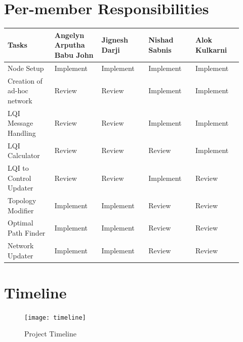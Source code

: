 \documentclass{article}
\begin{document}
\section{Per-member Responsibilities}
\begin{tabular}{ | p{0.185\linewidth} | p{0.185\linewidth} | p{0.185\linewidth} | p{0.185\linewidth} | p{0.185\linewidth} | }
\hline
\textbf{Tasks}	&	\textbf{Angelyn Arputha Babu John}	&	\textbf{Jignesh Darji}	&	\textbf{Nishad Sabnis}	& \textbf{Alok Kulkarni} \\
\hline \hline
Node Setup	&	Implement	&	Implement	&	Implement	&	Implement \\
\hline
Creation of ad-hoc network	&	Review	&	Review	&	Implement	&	Implement \\
\hline
LQI Message Handling	&	Review	&	Review	&	Implement	&	Implement \\ 
\hline
LQI Calculator	&	Review	&	Review	&	Review	&	Implement\\ 
\hline
LQI to Control Updater	&	Review	&	Review	&	Implement	&	Review \\
\hline
Topology Modifier	&	Implement	&	Implement	&	Review	&	Review\\
\hline
Optimal Path Finder	&	Implement	&	Implement	&	Review	&	Review\\
\hline
Network Updater	&	Implement	&	Implement	&	Review	&	Review\\
\hline
\end{tabular}

\section{Timeline}
\begin{figure}[H]
\caption{Project Timeline}
\centering
\texttt{[image: timeline]}
\end{figure}
\end{document}
